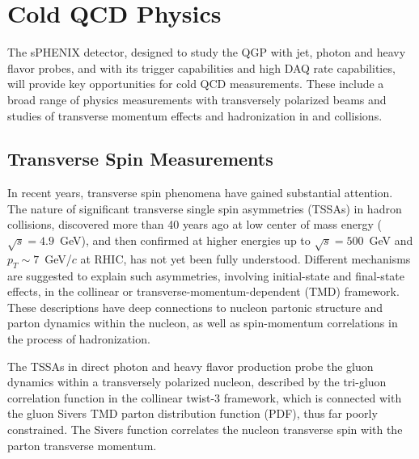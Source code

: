  

\section{Cold QCD Physics}
\label{sec:ColdQCD}

The sPHENIX detector, designed to study the QGP with jet, photon and
heavy flavor probes, and with its trigger capabilities and high DAQ
rate capabilities, will provide key opportunities for cold QCD
measurements. These include a broad range of physics measurements with
transversely polarized beams and studies of transverse momentum
effects and hadronization in \pp and \pA collisions.   


\subsection {Transverse Spin Measurements}

In recent years, transverse spin phenomena have gained substantial
attention. The nature of significant transverse single spin
asymmetries (TSSAs) in hadron collisions, discovered more than 40
years ago at low center of mass energy ($\sqrt{s}=4.9$~GeV), and then
confirmed at higher energies up to $\sqrt{s}=500$~GeV and $p_T \sim
7$~GeV/$c$ at RHIC, has not yet been fully understood. Different
mechanisms are suggested to explain such asymmetries, involving
initial-state and final-state effects, in the collinear or
transverse-momentum-dependent (TMD) framework. These descriptions have
deep connections to nucleon partonic structure and parton dynamics
within the nucleon, as well as spin-momentum correlations in the
process of hadronization. 

The TSSAs in direct photon and heavy flavor production probe the gluon
dynamics within a transversely polarized nucleon, described by the
tri-gluon correlation function in the collinear twist-3 framework,
which is connected with the gluon Sivers TMD parton distribution
function (PDF), thus far poorly constrained. The Sivers function
correlates the nucleon transverse spin with the parton transverse
momentum. 

